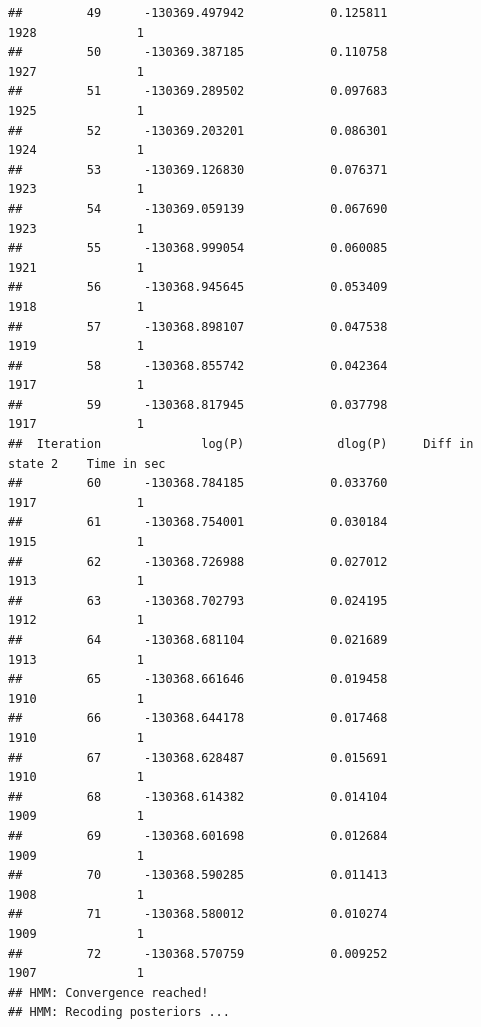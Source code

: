 \documentclass[11pt]{article}\usepackage[]{graphicx}\usepackage[]{color}
\makeatletter
\newenvironment{kframe}{%
 \def\at@end@of@kframe{}%
 \ifinner\ifhmode%
  \def\at@end@of@kframe{\end{minipage}}%
  \begin{minipage}{\columnwidth}%
 \fi\fi%
 \def\FrameCommand##1{\hskip\@totalleftmargin \hskip-\fboxsep
 \colorbox{shadecolor}{##1}\hskip-\fboxsep
     \hskip-\linewidth \hskip-\@totalleftmargin \hskip\columnwidth}%
 \MakeFramed {\advance\hsize-\width
   \@totalleftmargin\z@ \linewidth\hsize
   \@setminipage}}%
 {\par\unskip\endMakeFramed%
 \at@end@of@kframe}
\newenvironment{knitrout}{}{} %
\makeatother
\begin{document}
\begin{scriptsize}
\begin{knitrout}
\begin{kframe}
\begin{verbatim}
##         49      -130369.497942            0.125811                1928              1
##         50      -130369.387185            0.110758                1927              1
##         51      -130369.289502            0.097683                1925              1
##         52      -130369.203201            0.086301                1924              1
##         53      -130369.126830            0.076371                1923              1
##         54      -130369.059139            0.067690                1923              1
##         55      -130368.999054            0.060085                1921              1
##         56      -130368.945645            0.053409                1918              1
##         57      -130368.898107            0.047538                1919              1
##         58      -130368.855742            0.042364                1917              1
##         59      -130368.817945            0.037798                1917              1
##  Iteration              log(P)             dlog(P)     Diff in state 2    Time in sec
##         60      -130368.784185            0.033760                1917              1
##         61      -130368.754001            0.030184                1915              1
##         62      -130368.726988            0.027012                1913              1
##         63      -130368.702793            0.024195                1912              1
##         64      -130368.681104            0.021689                1913              1
##         65      -130368.661646            0.019458                1910              1
##         66      -130368.644178            0.017468                1910              1
##         67      -130368.628487            0.015691                1910              1
##         68      -130368.614382            0.014104                1909              1
##         69      -130368.601698            0.012684                1909              1
##         70      -130368.590285            0.011413                1908              1
##         71      -130368.580012            0.010274                1909              1
##         72      -130368.570759            0.009252                1907              1
## HMM: Convergence reached!
## HMM: Recoding posteriors ...
\end{verbatim}


{\ttfamily\noindent\itshape\color{messagecolor}{\#\# Calculating states from posteriors ... 0.03s\\\#\# Making segmentation ... 0.41s}}\end{kframe}
\end{knitrout}


\end{scriptsize}
\end{document}
